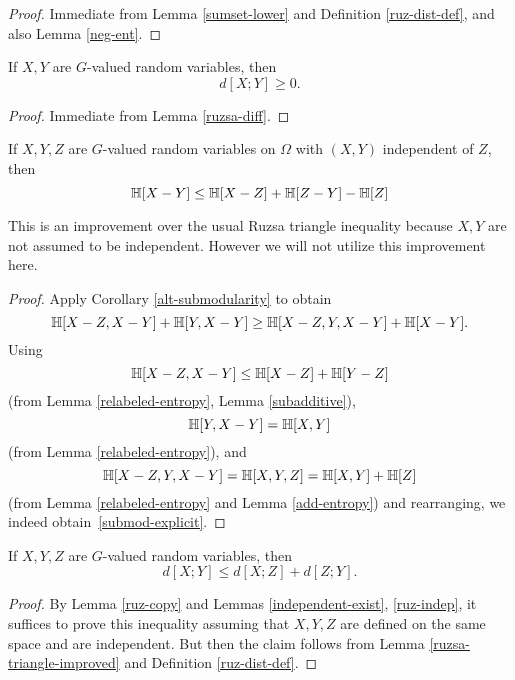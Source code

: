 \begin{proof}  \leanok Immediate from Lemma \ref{sumset-lower} and Definition \ref{ruz-dist-def}, and also Lemma \ref{neg-ent}.
\end{proof}

\begin{lemma}\label{ruzsa-nonneg}
  \leanok
  If $X,Y$ are $G$-valued random variables, then
  $$ d[X;Y] \geq 0.$$
\end{lemma}

\begin{proof}
  \leanok
  Immediate from Lemma \ref{ruzsa-diff}.
\end{proof}

\begin{lemma}\label{ruzsa-triangle-improved}\leanok  If $X,Y,Z$ are $G$-valued random variables on $\Omega$ with $(X,Y)$ independent of $Z$, then
  \begin{equation}\label{submod-explicit} \mathbb{H}[X - Y] \leq \mathbb{H}[X-Z] + \mathbb{H}[Z-Y] - \mathbb{H}[Z]\end{equation}
\end{lemma}

This is an improvement over the usual Ruzsa triangle inequality because $X,Y$ are not assumed to be independent.  However we will not utilize this improvement here.

\begin{proof}
  \leanok
  Apply Corollary \ref{alt-submodularity} to obtain
  \[ \mathbb{H}[X - Z, X - Y] + \mathbb{H}[Y, X - Y] \geq \mathbb{H}[X - Z, Y, X - Y] + \mathbb{H}[X - Y].\]
  Using
  \[ \mathbb{H}[X - Z, X - Y] \leq \mathbb{H}[X - Z] + \mathbb{H}[Y - Z]\]
  (from Lemma \ref{relabeled-entropy}, Lemma \ref{subadditive}),
  \[ \mathbb{H}[Y, X - Y] = \mathbb{H}[X, Y] \]
  (from Lemma \ref{relabeled-entropy}), and
  \[ \mathbb{H}[X - Z, Y, X - Y] = \mathbb{H}[X, Y, Z] = \mathbb{H}[X, Y] + \mathbb{H}[Z]\]
  (from Lemma \ref{relabeled-entropy} and Lemma \ref{add-entropy}) and rearranging, we indeed obtain~\eqref{submod-explicit}.
\end{proof}

\begin{lemma}
  \label{ruzsa-triangle}
  \leanok
  If $X,Y,Z$ are $G$-valued random variables, then
$$ d[X;Y] \leq d[X;Z] + d[Z;Y].$$
\end{lemma}

\begin{proof} By Lemma \ref{ruz-copy} and Lemmas \ref{independent-exist}, \ref{ruz-indep}, it suffices to prove this inequality assuming that $X,Y,Z$ are defined on the same space and are independent.  But then the claim follows from Lemma \ref{ruzsa-triangle-improved} and Definition \ref{ruz-dist-def}.
\end{proof}

